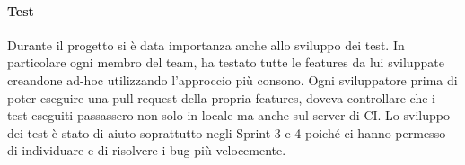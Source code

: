 \paragraph{Test}
Durante il progetto si è data importanza anche allo sviluppo dei test.
In particolare ogni membro del team, ha testato tutte le features da lui sviluppate creandone ad-hoc utilizzando l'approccio più consono.
Ogni sviluppatore prima di poter eseguire una pull request della propria features, doveva controllare che i test eseguiti passassero non solo in locale ma anche sul server di CI.
Lo sviluppo dei test è stato di aiuto soprattutto negli Sprint 3 e 4 poiché ci hanno permesso di individuare e di risolvere i bug più velocemente.

\newpage